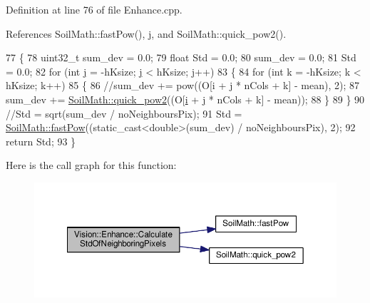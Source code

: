 Definition at line 76 of file Enhance.\+cpp.



References Soil\+Math\+::fast\+Pow(), j, and Soil\+Math\+::quick\+\_\+pow2().


\begin{DoxyCode}
77     \{
78         uint32\_t sum\_dev = 0.0;
79         \textcolor{keywordtype}{float} Std = 0.0;
80         sum\_dev = 0.0;
81         Std = 0.0;
82         \textcolor{keywordflow}{for} (\textcolor{keywordtype}{int} \hyperlink{_comparision_pictures_2_createtest_image_8m_ac86694252f8dfdb19aaeadc4b7c342c6}{j} = -hKsize; \hyperlink{_comparision_pictures_2_createtest_image_8m_ac86694252f8dfdb19aaeadc4b7c342c6}{j} < hKsize; \hyperlink{_comparision_pictures_2_createtest_image_8m_ac86694252f8dfdb19aaeadc4b7c342c6}{j}++)
83         \{
84             \textcolor{keywordflow}{for} (\textcolor{keywordtype}{int} k = -hKsize; k < hKsize; k++)
85             \{
86                 \textcolor{comment}{//sum\_dev += pow((O[i + j * nCols + k] - mean), 2);}
87                 sum\_dev += \hyperlink{namespace_soil_math_a69d186af0e164a5f98c42985aabec919}{SoilMath::quick\_pow2}((O[\hyperlink{_comparision_pictures_2_createtest_image_8m_a6f6ccfcf58b31cb6412107d9d5281426}{i} + \hyperlink{_comparision_pictures_2_createtest_image_8m_ac86694252f8dfdb19aaeadc4b7c342c6}{j} * nCols + k] - mean));
88             \}
89         \}
90         \textcolor{comment}{//Std = sqrt(sum\_dev / noNeighboursPix);}
91         Std = \hyperlink{namespace_soil_math_ab3886ae2a670a717bbe01f94543922a0}{SoilMath::fastPow}((static\_cast<double>(sum\_dev) / noNeighboursPix), 2);
92         \textcolor{keywordflow}{return} Std;
93     \}
\end{DoxyCode}


Here is the call graph for this function\+:\nopagebreak
\begin{figure}[H]
\begin{center}
\leavevmode
\includegraphics[width=350pt]{class_vision_1_1_enhance_ac03740bd6b3cd2936a579644c9646ce0_cgraph}
\end{center}
\end{figure}


